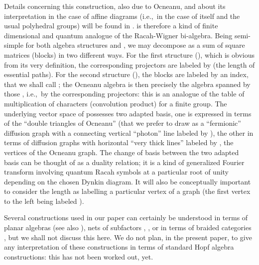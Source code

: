 \documentclass[a4paper,11pt]{article}
\def\ie{{\rm i.e.,\/}\ }
\begin{document}
Details concerning this construction, also due to Ocneanu, and about
its interpretation in
the case of affine \coordHE{} diagrams (\ie in the case of \coordHE{} itself
and the usual polyhedral groups) will be found in \cite{CoGaTr:triangles}.
\coordHE{} is therefore a kind of finite dimensional and quantum
analogue of the
Racah-Wigner bi-algebra. Being semi-simple for both algebra
structures \myHighlight{$\circ$}\coordHE{} and \myHighlight{$\ast$}\coordHE{}, we may decompose \coordHE{} as
a sum of square matrices (blocks) in two different ways. For the first
structure (\myHighlight{$\circ$}\coordHE{}), which is obvious from its very definition,
the corresponding projectors are labeled by \coordHE{} (the length of
essential paths). For the second structure (\myHighlight{$\ast$}\coordHE{}), the blocks
are labeled by an index, that we shall call \coordHE{}; the Ocneanu algebra
is then precisely the algebra spanned by those \coordHE{}, \ie by the
corresponding projectors: this is an analogue of the table of multiplication of
characters (convolution product) for a  finite group.
The underlying vector space of \coordHE{}
possesses two adapted basis, one is expressed in terms of the ``double
triangles of Ocneanu'' (that we prefer to draw as a ``fermionic''
diffusion graph
with a connecting vertical ``photon'' line labeled by \coordHE{}), the other in terms
of diffusion graphs with horizontal ``very thick lines'' labeled by \coordHE{}, the
vertices of the Ocneanu graph. The change of basis between the two
adapted basis can be thought of as a duality relation; it is a kind
of generalized Fourier
transform involving quantum Racah symbols at a particular root of unity
depending on the chosen
Dynkin diagram. It will also be conceptually important to
consider the length \coordHE{} as labelling a particular vertex of a \coordHE{}
graph (the first vertex to the left being labeled \coordHE{}).

Several constructions used in our paper can certainly be understood in terms of
planar algebras \cite{Jones:planar} (see also \cite{Jones:book}), nets of subfactors
\cite{Evans-1}, \cite{Evans-2},  or in
terms of braided categories
\cite{Kirilov:ADE}, but we shall not discuss this here.
We do not plan, in the present paper, to give any interpretation of
these constructions in terms of standard Hopf algebra constructions:
this has not been worked out, yet.
\end{document}
